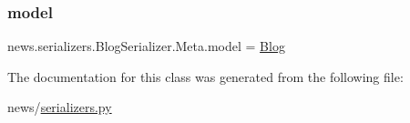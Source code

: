 \mbox{\label{classnews_1_1serializers_1_1_blog_serializer_1_1_meta_ab2a309acb0e3758709b853f234dc3f0d}} 
\subsubsection{\texorpdfstring{model}{model}}
{\footnotesize\ttfamily news.\+serializers.\+Blog\+Serializer.\+Meta.\+model = \mbox{\hyperlink{classnews_1_1models_1_1_blog}{Blog}}\hspace{0.3cm}{\ttfamily [static]}}



The documentation for this class was generated from the following file\+:\begin{DoxyCompactItemize}
\item 
news/\mbox{\hyperlink{serializers_8py}{serializers.\+py}}\end{DoxyCompactItemize}
